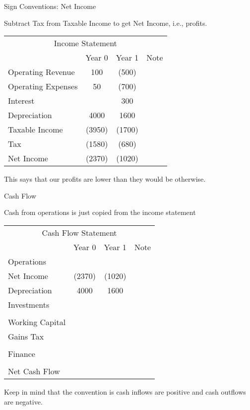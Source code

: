\documentclass[ignorenonframetext,]{beamer}
\begin{document}
\begin{frame}{Sign Conventions: Net Income}

Subtract Tax from Taxable Income to get Net Income, i.e., profits.

\begin{table}[h]
\begin{tabular}{l||c|c||p{3cm}}
\multicolumn{4}{c}{Income Statement}\\
  &Year 0  &Year 1  &Note\\
\hline
        Operating Revenue   &   100 & (500) &\\
        Operating Expenses  &   50& (700)   &\\
        Interest    &   &   300&\\
        Depreciation    &   4000&   1600&\\
        \hline
        Taxable Income  &   (3950)& (1700)  &\\
                Tax &   (1580)& (680)&\\
        \hline
        Net Income &    (2370)& (1020)&\\
\end{tabular}
\end{table}

This says that our profits are lower than they would be otherwise.

\end{frame}

\begin{frame}{Cash Flow}

Cash from operations is just copied from the income statement

\begin{table}
\begin{tabular}{l||c|c||p{3cm}}
        \multicolumn{4}{c}{Cash Flow Statement}\\
  &Year 0  &Year 1  &Note\\        
    Operations& &   &\\
    \hspace{.25in}Net Income    &   (2370)& (1020)&\\
    \hspace{.25in}Depreciation  &   4000&   1600&\\
    Investments &   &   &\\
            &   &   &\\
\hspace{.25in}Working Capital   &   &   &\\
        \hspace{.25in}Gains Tax &   &   &\\
            &   &   &\\
        
    Finance &   &   &\\
            &   &   &\\
        \hline
        Net Cash Flow   &   &   &\\
\end{tabular}
\end{table}

Keep in mind that the convention is cash inflows are positive and cash
outflows are negative.

\end{frame}
\end{document}
